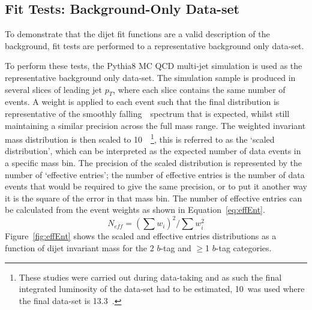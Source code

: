 \subsection{Fit Tests: Background-Only Data-set}
\label{sec:bkg-summer_fitCR}

To demonstrate that the dijet fit functions are a valid description of the background,
fit tests are performed to a representative background only data-set.

To perform these tests, the {\sc Pythia}8 MC QCD multi-jet simulation is used as the representative background only data-set.
The simulation sample is produced in several slices of leading jet $p_{T}$, where each slice contains the same number of events.
A weight is applied to each event such that the final distribution is representative of the smoothly falling~\mjj~spectrum that is expected,
whilst still maintaining a similar precision across the full mass range.
The weighted invariant mass distribution is then scaled to 10~\ifb~\footnote{
  These studies were carried out during data-taking
  and as such the final integrated luminosity of the data-set had to be estimated,
  10~\ifb was used where the final data-set is 13.3~\ifb.
},
this is referred to as the  `scaled distribution', which can be interpreted as the expected number of data events in a specific mass bin. 
The precision of the scaled distribution is represented by the number of `effective entries';
the number of effective entries is the number of data events that would be required to give the same precision,
or to put it another way it is the square of the error in that mass bin. The number of effective entries can be calculated from the event weights as shown in Equation~\ref{eq:effEnt}.
\begin{equation}
  N_{eff} = (\sum{w_i})^2 / \sum{w_i^2}
  \label{eq:effEnt}
\end{equation}
Figure~\ref{fig:effEnt} shows the scaled and effective entries distributions as a function of dijet invariant mass for the 2 $b$-tag and $\geq$1 $b$-tag categories. 

